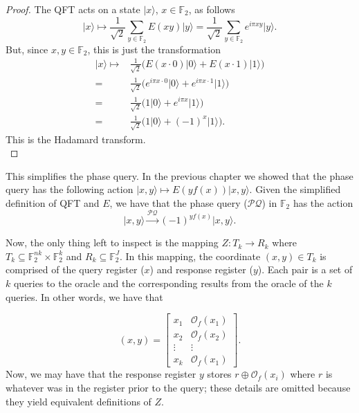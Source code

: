 \documentclass[12pt,twoside]{reedthesis}
\theoremstyle{definition}
\newcommand{\F}{\mathbb{F}}
\newcommand{\ket}[1]{\ensuremath{\lvert #1\rangle}\xspace}
\begin{document}
\begin{proof}
The QFT acts on a state $\ket{x}$, $x\in \F_2$, as follows
\begin{equation*}
\ket{x}  \longmapsto \frac{1}{\sqrt{2}}\sum_{y\in \F_2} E(xy)\ket{y}
=  \frac{1}{\sqrt{2}}\sum_{y\in \F_2} e^{i\pi xy}\ket{y}.
\end{equation*}
But, since $x,y \in \F_2$, this is just the transformation
\begin{align*}
\ket{x}  \longmapsto 
&\frac{1}{\sqrt{2}}\bigg( E(x\cdot 0)\ket{0} + E(x\cdot 1)\ket{1} \bigg) \\
 = &  \frac{1}{\sqrt{2}}\bigg( e^{i\pi x\cdot 0}\ket{0} + e^{i\pi x\cdot 1}\ket{1} \bigg) \\
 = & \frac{1}{\sqrt{2}}\bigg( 1\ket{0} + e^{i\pi x}\ket{1} \bigg) \\
 = & \frac{1}{\sqrt{2}}\bigg( 1\ket{0} + (-1)^x\ket{1} \bigg). 
\end{align*}
This is the Hadamard transform. \\
\end{proof}

This simplifies the phase query. In the previous chapter we showed that the phase query has the following action $\ket{x,y} \mapsto E(yf(x))\ket{x,y}$. Given the simplified definition of QFT and $E$, we have that the phase query ($\mathcal{PQ}$) in $\F_2$ has the action
\begin{equation}
\ket{x,y} \xrightarrow{\mathcal{PQ}} (-1)^{yf(x)} \ket{x,y}.
\end{equation}

Now, the only thing left to inspect is the mapping $Z: T_k \rightarrow R_k$ where $T_k \subseteq \F_2^{nk} \times \F_2^k$ and $R_k \subseteq \F_2^J$. In this mapping, the coordinate $(x,y) \in T_k$ is comprised of the query register ($x$) and response register ($y$). Each pair is a set of $k$ queries to the oracle and the corresponding results from the oracle of the $k$ queries. In other words, we have that

\begin{equation*}
(x, y) =
\begin{bmatrix}
x_1 & \mathcal{O}_f(x_1) \\
x_2 & \mathcal{O}_f(x_2)\\
\vdots & \vdots \\
x_k & \mathcal{O}_f(x_1)
\end{bmatrix}.
\end{equation*}
Now,  we may have that the response register $y$ stores $r \oplus \mathcal{O}_f(x_i)$  where $r$ is whatever was in the register prior to the query; these details are omitted because they yield equivalent definitions of $Z$.
\end{document}
